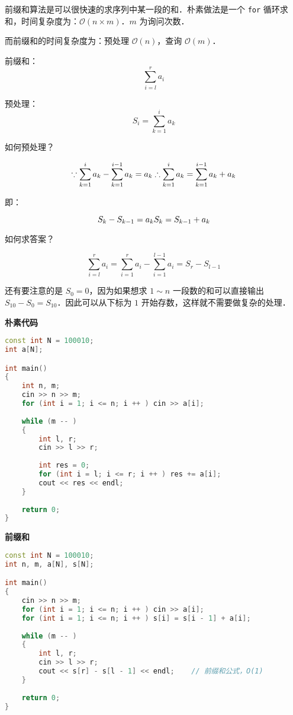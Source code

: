 
前缀和算法是可以很快速的求序列中某一段的和．朴素做法是一个 \verb|for| 循环求和，时间复杂度为：$\mathcal{O}(n \times m)$．$m$ 为询问次数．

而前缀和的时间复杂度为：预处理 $\mathcal{O}(n)$，查询 $\mathcal{O}(m)$．

前缀和：
\begin{equation}
\sum^{r}_{i=l}a_i
\end{equation}

预处理：
\begin{equation}
S_i=\sum^{i}_{k=1}a_k
\end{equation}

如何预处理？

\begin{equation}
\because 
\sum^{i}_{k=1}a_k-\sum^{i-1}_{k=1}a_{k}=a_k \\
 \therefore \sum^{i}_{k=1}a_k=\sum^{i-1}_{k=1}a_{k}+a_k \\
\end{equation}

即：

\begin{equation}
\\S_k-S_{k-1}=a_k\\
 \\S_k=S_{k-1}+a_k\\
\end{equation}

如何求答案？

\begin{equation}
\sum^{r}_{i=l}a_i=\sum^{r}_{i=1}a_i-\sum^{l-1}_{i=1}a_i=S_r-S_{l-1}
\end{equation}

还有要注意的是 $S_0 = 0$，因为如果想求 $1 \sim n$ 一段数的和可以直接输出 $S_{10} - S_0 = S_{10} $．因此可以从下标为 $1$ 开始存数，这样就不需要做复杂的处理．

\textbf{朴素代码}
\begin{lstlisting}[language=cpp]
const int N = 100010;
int a[N];

int main()
{
    int n, m;
    cin >> n >> m;
    for (int i = 1; i <= n; i ++ ) cin >> a[i];
    
    while (m -- )
    {
        int l, r;
        cin >> l >> r;
        
        int res = 0;
        for (int i = l; i <= r; i ++ ) res += a[i];
        cout << res << endl;
    }
    
    return 0;
}
\end{lstlisting}

\textbf{前缀和}
\begin{lstlisting}[language=cpp]
const int N = 100010;
int n, m, a[N], s[N];

int main() 
{
    cin >> n >> m;
    for (int i = 1; i <= n; i ++ ) cin >> a[i];
    for (int i = 1; i <= n; i ++ ) s[i] = s[i - 1] + a[i];
    
    while (m -- )
    {
        int l, r;
        cin >> l >> r;
        cout << s[r] - s[l - 1] << endl;    // 前缀和公式，O(1)
    }
    
    return 0;
}
\end{lstlisting}